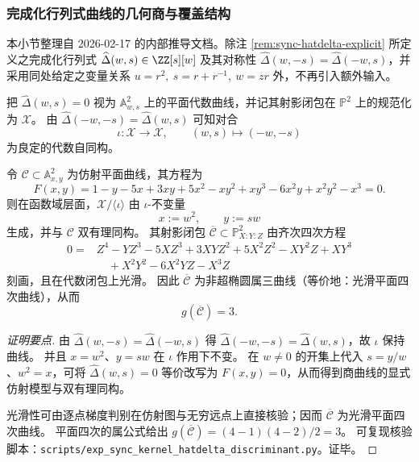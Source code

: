 \subsubsection{完成化行列式曲线的几何商与覆盖结构}\label{subsubsec:sync-kernel-hatdelta-curve-geometry}
本小节整理自 2026-02-17 的内部推导文档。除注 \ref{rem:sync-hatdelta-explicit} 所定义之完成化行列式
\(\widehat{\Delta}(w,s)\in\ZZ[s][w]\) 及其对称性
\(\widehat\Delta(w,-s)=\widehat\Delta(-w,s)\)，并采用同处给定之变量关系
\(
u=r^2,\ s=r+r^{-1},\ w=zr
\)
外，不再引入额外输入。
\par
把 \(\widehat\Delta(w,s)=0\) 视为 \(\mathbb{A}^2_{w,s}\) 上的平面代数曲线，并记其射影闭包在 \(\mathbb{P}^2\) 上的规范化为 \(\mathcal{X}\)。
由
\(
\widehat\Delta(-w,-s)=\widehat\Delta(w,s)
\)
可知对合
\[
\iota:\mathcal{X}\longrightarrow\mathcal{X},\qquad (w,s)\longmapsto(-w,-s)
\]
为良定的代数自同构。

\begin{proposition}\label{prop:sync-hatdelta-curve-quotient-plane-quartic-genus3}
令 \(\mathcal{C}\subset\mathbb{A}^2_{x,y}\) 为仿射平面曲线，其方程为
\[
F(x,y)=1-y-5x+3xy+5x^2-xy^2+xy^3-6x^2y+x^2y^2-x^3=0.
\]
则在函数域层面，\(\mathcal{X}/\langle\iota\rangle\) 由 \(\iota\)-不变量
\[
x:=w^2,\qquad y:=sw
\]
生成，并与 \(\mathcal{C}\) 双有理同构。
其射影闭包 \(\overline{\mathcal{C}}\subset\mathbb{P}^2_{X:Y:Z}\) 由齐次四次方程
\[
\begin{aligned}
0={}&Z^4-YZ^3-5XZ^3+3XYZ^2+5X^2Z^2-XY^2Z+XY^3\\
&\quad +X^2Y^2-6X^2YZ-X^3Z
\end{aligned}
\]
刻画，且在代数闭包上光滑。
因此 \(\overline{\mathcal{C}}\) 为非超椭圆属三曲线（等价地：光滑平面四次曲线），从而
\[
g(\overline{\mathcal{C}})=3.
\]
\end{proposition}
\begin{proof}[证明要点]
由 \(\widehat\Delta(w,-s)=\widehat\Delta(-w,s)\) 得 \(\widehat\Delta(-w,-s)=\widehat\Delta(w,s)\)，故 \(\iota\) 保持曲线。
并且 \(x=w^2\)、\(y=sw\) 在 \(\iota\) 作用下不变。
在 \(w\neq 0\) 的开集上代入 \(s=y/w\)、\(w^2=x\)，可将 \(\widehat\Delta(w,s)=0\) 等价改写为 \(F(x,y)=0\)，从而得到商曲线的显式仿射模型与双有理同构。
\par
光滑性可由逐点梯度判别在仿射图与无穷远点上直接核验；因而 \(\overline{\mathcal{C}}\) 为光滑平面四次曲线。
平面四次的属公式给出 \(g(\overline{\mathcal{C}})=(4-1)(4-2)/2=3\)。
可复现核验脚本：\texttt{scripts/exp\_sync\_kernel\_hatdelta\_discriminant.py}。证毕。
\end{proof}

